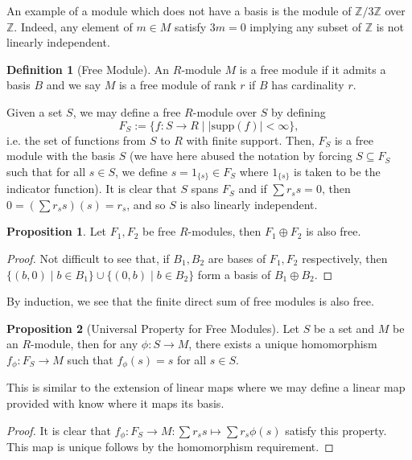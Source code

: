 \documentclass[]{article}
\theoremstyle{definition}
\theoremstyle{definition}
\newtheorem{definition}{Definition}[section]
\newtheorem{proposition}{Proposition}[section]
\begin{document}
An example of a module which does not have a basis is the module of 
\(\mathbb{Z} / 3\mathbb{Z}\) over \(\mathbb{Z}\). Indeed, any element of \(m \in M\) 
satisfy \(3m = 0\) implying any subset of \(\mathbb{Z}\) is not linearly 
independent.

\begin{definition}[Free Module]
  An \(R\)-module \(M\) is a free module if it admits a basis \(B\) 
  and we say \(M\) is a free module of rank \(r\) if \(B\) has cardinality \(r\).
\end{definition}

Given a set \(S\), we may define a free \(R\)-module over \(S\) by defining 
\[F_S := \{f : S \to R \mid |\text{supp}(f)| < \infty\},\]
i.e. the set of functions from \(S\) to \(R\) with finite support. Then, 
\(F_S\) is a free module with the basis \(S\) (we have here abused the notation 
by forcing \(S \subseteq F_S\) such that for all \(s \in S\), we define
\(s = 1_{\{s\}} \in F_S\) where \(1_{\{s\}}\) is taken to be the indicator 
function). It is clear that \(S\) spans \(F_S\) and if 
\(\sum r_s s = 0\), then \(0 = (\sum r_s s)(s) = r_s\), and so 
\(S\) is also linearly independent.

\begin{proposition}
  Let \(F_1, F_2\) be free \(R\)-modules, then \(F_1 \oplus F_2\) is also free.
\end{proposition}
\begin{proof}
  Not difficult to see that, if \(B_1, B_2\) are bases of \(F_1, F_2\) respectively, 
  then \(\{(b, 0) \mid b \in B_1\} \cup \{(0, b) \mid b \in B_2\}\) form a 
  basis of \(B_1 \oplus B_2\).
\end{proof}

By induction, we see that the finite direct sum of free modules is also free. 

\begin{proposition}[Universal Property for Free Modules]
  Let \(S\) be a set and \(M\) be an \(R\)-module, then for any 
  \(\phi : S \to M\), there exists a unique homomorphism 
  \(f_\phi : F_S \to M\) such that \(f_\phi(s) = s\) for all \(s \in S\).
\end{proposition}

This is similar to the extension of linear maps where we may define a linear 
map provided with know where it maps its basis.

\begin{proof}
  It is clear that \(f_\phi : F_S \to M : \sum r_s s \mapsto \sum r_s \phi(s)\) 
  satisfy this property. This map is unique follows by the homomorphism 
  requirement.  
\end{proof}
\end{document}
